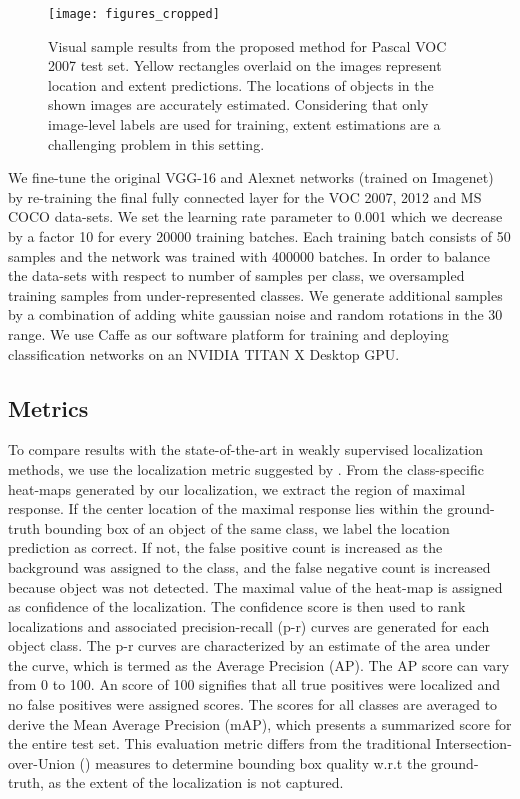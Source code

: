 \documentclass[runningheads]{llncs}
\begin{document}
\begin{figure*}
\begin{center}
\texttt{[image: figures\_cropped]}
\end{center}
\caption{Visual sample results from the proposed method for Pascal VOC 2007 test set. Yellow rectangles overlaid on the images represent location and extent predictions. The locations of objects in the shown images are accurately estimated. Considering that only image-level labels are used for training, extent estimations are a challenging problem in this setting.}
\label{fig:visualresults}
\end{figure*}


We fine-tune the original VGG-16 and Alexnet networks (trained on Imagenet) by re-training the final fully connected layer for the VOC 2007, 2012 and MS COCO data-sets. We set the learning rate parameter to 0.001 which we decrease by a factor 10 for every 20000 training batches. Each training batch consists of   50 samples and the network was trained with 400000 batches. In order to balance the data-sets with respect to number of samples per class, we oversampled training samples from under-represented classes. We generate additional samples by a combination of adding white gaussian noise and random rotations in the  30  range. We use Caffe \cite{jia2014caffe} as our software platform for training and deploying classification networks on an NVIDIA TITAN X Desktop GPU.




\subsection{Metrics}
To compare results with the state-of-the-art in weakly supervised localization methods, we use the localization metric suggested by \cite{oquabobject}. From the class-specific heat-maps generated by our localization, we extract the region of maximal response. If the center location of the maximal response lies within the ground-truth bounding box of an object of the same class, we label the location prediction as correct. If not, the false positive count is increased as the background was assigned to the class, and the false negative count is increased because object was not detected. The maximal value of the heat-map is assigned as confidence of the localization. The confidence score is then used to rank localizations and associated precision-recall (p-r) curves are generated for each object class. The p-r curves are characterized by an estimate of the area under the curve, which is termed as the Average Precision (AP). The AP score can vary from 0 to 100. An  score of 100 signifies that all true positives were localized and no false positives were assigned scores. The  scores for all classes are averaged to derive the Mean Average Precision (mAP), which presents a summarized score for the entire test set. This evaluation metric differs from the traditional Intersection-over-Union () measures to determine bounding box quality w.r.t the ground-truth, as the extent of the localization is not captured.
\end{document}
